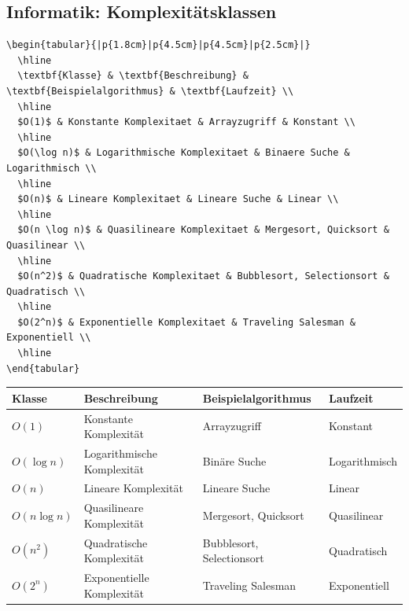 \documentclass[12pt,a4paper]{article}
\begin{document}
\subsection{Informatik: Komplexitätsklassen}

\begin{lstlisting}[style=latex]
\begin{tabular}{|p{1.8cm}|p{4.5cm}|p{4.5cm}|p{2.5cm}|}
  \hline
  \textbf{Klasse} & \textbf{Beschreibung} & \textbf{Beispielalgorithmus} & \textbf{Laufzeit} \\
  \hline
  $O(1)$ & Konstante Komplexitaet & Arrayzugriff & Konstant \\
  \hline
  $O(\log n)$ & Logarithmische Komplexitaet & Binaere Suche & Logarithmisch \\
  \hline
  $O(n)$ & Lineare Komplexitaet & Lineare Suche & Linear \\
  \hline
  $O(n \log n)$ & Quasilineare Komplexitaet & Mergesort, Quicksort & Quasilinear \\
  \hline
  $O(n^2)$ & Quadratische Komplexitaet & Bubblesort, Selectionsort & Quadratisch \\
  \hline
  $O(2^n)$ & Exponentielle Komplexitaet & Traveling Salesman & Exponentiell \\
  \hline
\end{tabular}
\end{lstlisting}

\begin{ausgabe}
\begin{center}
\begin{tabular}{|p{1.8cm}|p{4.5cm}|p{4.5cm}|p{2.5cm}|}
  \hline
  \textbf{Klasse} & \textbf{Beschreibung} & \textbf{Beispielalgorithmus} & \textbf{Laufzeit} \\
  \hline
  $O(1)$ & Konstante Komplexität & Arrayzugriff & Konstant \\
  \hline
  $O(\log n)$ & Logarithmische Komplexität & Binäre Suche & Logarithmisch \\
  \hline
  $O(n)$ & Lineare Komplexität & Lineare Suche & Linear \\
  \hline
  $O(n \log n)$ & Quasilineare Komplexität & Mergesort, Quicksort & Quasilinear \\
  \hline
  $O(n^2)$ & Quadratische Komplexität & Bubblesort, Selectionsort & Quadratisch \\
  \hline
  $O(2^n)$ & Exponentielle Komplexität & Traveling Salesman & Exponentiell \\
  \hline
\end{tabular}
\end{center}
\end{ausgabe}
\end{document}

